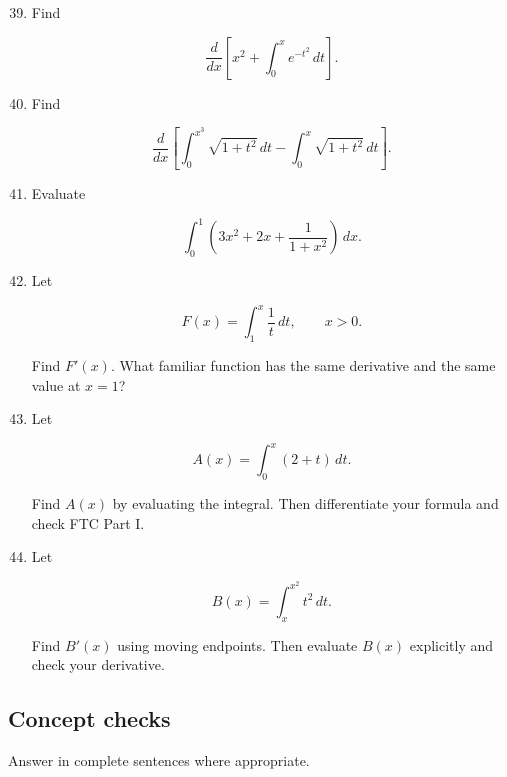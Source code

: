\begin{enumerate}
\setcounter{enumi}{38}

\item Find

\[
\frac{d}{dx}\left[
x^2+\int_0^x e^{-t^2}\,dt
\right].
\]

\item Find

\[
\frac{d}{dx}\left[
\int_0^{x^3} \sqrt{1+t^2}\,dt
-
\int_0^{x} \sqrt{1+t^2}\,dt
\right].
\]

\item Evaluate

\[
\int_0^1 \left(3x^2+2x+\frac{1}{1+x^2}\right)\,dx.
\]

\item Let

\[
F(x)=\int_1^x \frac{1}{t}\,dt,
\qquad x>0.
\]

Find \(F'(x)\).  What familiar function has the same derivative and the same value at
\(x=1\)?

\item Let

\[
A(x)=\int_0^x (2+t)\,dt.
\]

Find \(A(x)\) by evaluating the integral.  Then differentiate your formula and check
FTC Part I.

\item Let

\[
B(x)=\int_x^{x^2} t^2\,dt.
\]

Find \(B'(x)\) using moving endpoints.  Then evaluate \(B(x)\) explicitly and check
your derivative.

\end{enumerate}

\subsection{Concept checks}
\label{subsec:chapter9-concept-checks}

Answer in complete sentences where appropriate.

